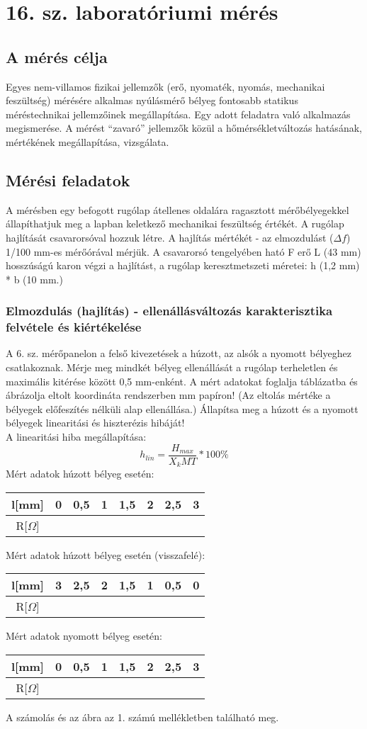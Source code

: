 \documentclass[10pt,a4paper]{article}
\begin{document}
\section{16. sz. laboratóriumi mérés}
	\subsection{A mérés célja}
	Egyes nem-villamos fizikai jellemzők (erő, nyomaték, nyomás, mechanikai feszültség)
mérésére alkalmas nyúlásmérő bélyeg fontosabb statikus méréstechnikai jellemzőinek
megállapítása. Egy adott feladatra való alkalmazás megismerése. A mérést “zavaró” jellemzők közül a hőmérsékletváltozás hatásának, mértékének megállapítása, vizsgálata.
	\subsection{Mérési feladatok}
	A mérésben egy befogott rugólap átellenes oldalára ragasztott mérőbélyegekkel állapíthatjuk
meg a lapban keletkező mechanikai feszültség értékét. A rugólap hajlítását csavarorsóval
hozzuk létre.
A hajlítás mértékét - az elmozdulást ($\Delta f$) 1/100 mm-es mérőórával mérjük.
A csavarorsó tengelyében ható F erő L (43 mm) hosszúságú karon végzi a hajlítást, a rugólap
keresztmetszeti méretei: h (1,2 mm) * b (10 mm.)
		\subsubsection{Elmozdulás (hajlítás) - ellenállásváltozás karakterisztika felvétele és kiértékelése}
		A 6. sz. mérőpanelon a felső kivezetések a húzott, az alsók a nyomott bélyeghez csatlakoznak.
Mérje meg mindkét bélyeg ellenállását a rugólap terheletlen és maximális kitérése között 0,5
mm-enként. A mért adatokat foglalja táblázatba és ábrázolja eltolt koordináta rendszerben mm papíron! (Az eltolás mértéke a bélyegek előfeszítés nélküli alap ellenállása.)
Állapítsa meg a húzott és a nyomott bélyegek linearitási és hiszterézis hibáját!$$$$A linearitási hiba megállapítása:$$h_{lin}=\frac{H_{max}}{X_kMT}*100 \%$$Mért adatok húzott bélyeg esetén:$$$$\begin{tabular}{|c|c|c|c|c|c|c|c|}
\hline 
l[mm] & 0 & 0,5 & 1 & 1,5 & 2 & 2,5 & 3 \\ 
\hline 
R[$\Omega$] &  &  &  &  &  &  &  \\ 
\hline 
\end{tabular} $$$$
Mért adatok húzott bélyeg esetén (visszafelé):$$$$\begin{tabular}{|c|c|c|c|c|c|c|c|}
\hline 
l[mm] & 3 & 2,5 & 2 & 1,5 & 1 & 0,5 & 0 \\ 
\hline 
R[$\Omega$] &  &  &  &  &  &  &  \\ 
\hline 
\end{tabular}$$$$
Mért adatok nyomott bélyeg esetén:$$$$\begin{tabular}{|c|c|c|c|c|c|c|c|}
\hline 
l[mm] & 0 & 0,5 & 1 & 1,5 & 2 & 2,5 & 3 \\ 
\hline 
R[$\Omega$] &  &  &  &  &  &  &  \\ 
\hline 
\end{tabular} $$$$ A számolás és az ábra az 1. számú mellékletben található meg.
\end{document}

